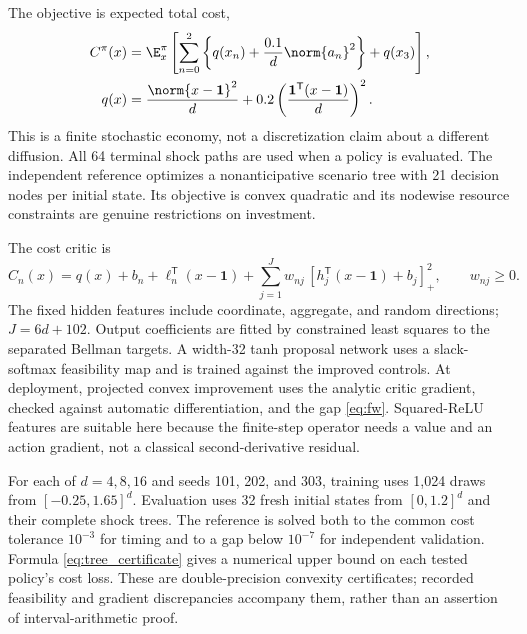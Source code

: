 The objective is expected total cost,
\begin{equation}
 \begin{aligned}
 C^\pi(x)&=\E_x^\pi\left[
 \sum_{n=0}^{2}\left\{q(x_n)+\frac{0.1}{d}\norm{a_n}^2\right\}+q(x_3)\right],
 \\
 q(x)&=\frac{\norm{x-\mathbf1}^2}{d}
           +0.2\left(\frac{\mathbf1^{\mathsf T}(x-\mathbf1)}d\right)^2.
 \end{aligned}
 \label{eq:resource_cost}
\end{equation}
This is a finite stochastic economy, not a discretization claim about a different diffusion. All 64 terminal shock paths are used when a policy is evaluated. The independent reference optimizes a nonanticipative scenario tree with 21 decision nodes per initial state. Its objective is convex quadratic and its nodewise resource constraints are genuine restrictions on investment.

The cost critic is
\begin{equation}
 \widehat C_n(x)=q(x)+b_n+\ell_n^{\mathsf T}(x-\mathbf1)
     +\sum_{j=1}^{J}w_{nj}\,[h_j^{\mathsf T}(x-\mathbf1)+b_j]_+^2,
 \qquad w_{nj}\geq0.
 \label{eq:convex_critic}
\end{equation}
The fixed hidden features include coordinate, aggregate, and random directions; $J=6d+102$. Output coefficients are fitted by constrained least squares to the separated Bellman targets. A width-32 tanh proposal network uses a slack-softmax feasibility map and is trained against the improved controls. At deployment, projected convex improvement uses the analytic critic gradient, checked against automatic differentiation, and the gap \eqref{eq:fw}. Squared-ReLU features are suitable here because the finite-step operator needs a value and an action gradient, not a classical second-derivative residual.

For each of $d=4,8,16$ and seeds 101, 202, and 303, training uses 1,024 draws from $[-0.25,1.65]^d$. Evaluation uses 32 fresh initial states from $[0,1.2]^d$ and their complete shock trees. The reference is solved both to the common cost tolerance $10^{-3}$ for timing and to a gap below $10^{-7}$ for independent validation. Formula \eqref{eq:tree_certificate} gives a numerical upper bound on each tested policy's cost loss. These are double-precision convexity certificates; recorded feasibility and gradient discrepancies accompany them, rather than an assertion of interval-arithmetic proof.


